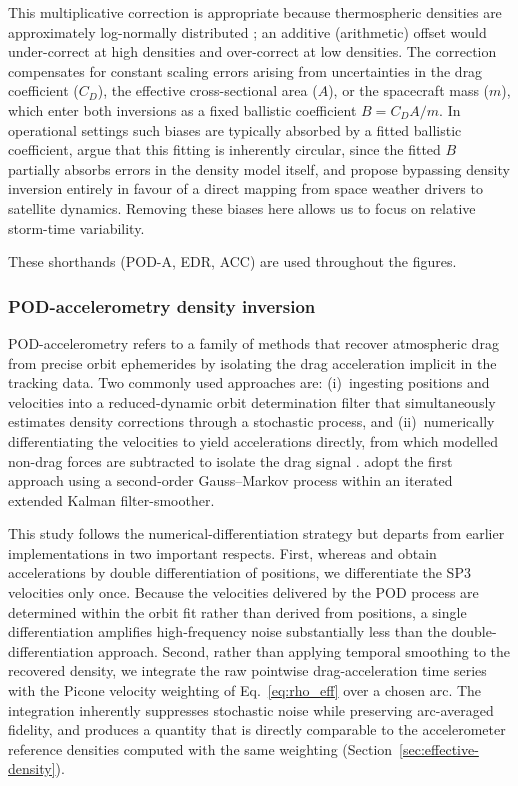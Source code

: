 \documentclass{agujournal2019}
\begin{document}
\noindent This multiplicative correction is appropriate because thermospheric
densities are approximately log-normally distributed
\cite{Emmert2015ThermosphericReview, Picone2005ThermosphericSets}; an additive
(arithmetic) offset would under-correct at high densities and over-correct at
low densities. The correction compensates for constant scaling errors arising
from uncertainties in the drag coefficient ($C_D$), the effective
cross-sectional area ($A$), or the spacecraft mass ($m$), which enter both
inversions as a fixed ballistic coefficient $B = C_D A / m$. In operational
settings such biases are typically absorbed by a fitted ballistic coefficient,
 argue that this fitting is inherently circular, since the fitted $B$ partially absorbs errors in the density model itself, and propose bypassing density inversion entirely in favour of a direct mapping from space weather drivers to satellite dynamics.
Removing these biases here allows us to focus on relative storm-time variability.

These shorthands (POD-A, EDR, ACC) are used throughout the figures.

\subsubsection{POD-accelerometry density inversion}
\label{sec:pod-density-inversion}

POD-accelerometry refers to a family of methods that recover atmospheric
drag from precise orbit ephemerides by isolating the drag acceleration
implicit in the tracking data. Two commonly used approaches are:
(i)~ingesting positions and velocities into a reduced-dynamic orbit
determination filter that simultaneously estimates density corrections
through a stochastic process, and (ii)~numerically differentiating the
velocities to yield accelerations directly, from which modelled non-drag
forces are subtracted to isolate the drag signal
\cite{Bezdek2010CalibrationAccelerations, Calabia2015ASignal,
Calabia2017ThermosphericOrbits}.  adopt
the first approach using a second-order Gauss--Markov process within an
iterated extended Kalman filter-smoother.

This study follows the numerical-differentiation strategy but departs from
earlier implementations in two important respects. First, whereas
 and 
obtain accelerations by double differentiation of positions, we differentiate
the SP3 velocities only once. Because the velocities delivered by the POD
process are determined within the orbit fit rather than derived from
positions, a single differentiation amplifies high-frequency noise
substantially less than the double-differentiation approach. Second, rather
than applying temporal smoothing to the recovered density, we integrate the
raw pointwise drag-acceleration time series with the Picone velocity weighting
of Eq.~\eqref{eq:rho_eff} over a chosen arc. The integration inherently
suppresses stochastic noise while preserving arc-averaged fidelity, and
produces a quantity that is directly comparable to the accelerometer reference
densities computed with the same weighting
(Section~\ref{sec:effective-density}).
\end{document}
